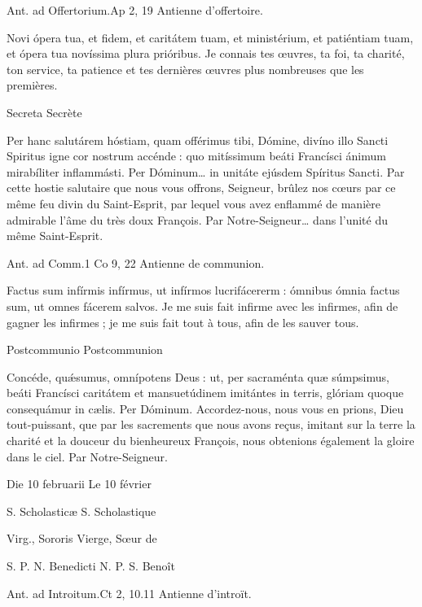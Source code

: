 \begin{paracol}{2}
Ant. ad Offertorium.\hfill Ap 2, 19
\switchcolumn
Antienne d’offertoire.
\switchcolumn*

Novi ópera tua, et fidem, et caritátem tuam, et ministérium, et patiéntiam tuam, et ópera tua novíssima plura prióribus.
\switchcolumn
Je connais tes œuvres, ta foi, ta charité, ton service, ta patience et tes dernières œuvres plus nombreuses que les premières.
\switchcolumn*

Secreta
\switchcolumn
Secrète
\switchcolumn*

Per hanc salutárem hóstiam,  quam offérimus tibi, Dómine, divíno illo Sancti Spiritus igne cor nostrum accénde : quo mitíssimum beáti Francísci ánimum mirabíliter inflammásti. Per Dóminum… in unitáte ejúsdem Spíritus Sancti.
\switchcolumn
Par cette hostie salutaire que nous vous  offrons, Seigneur, brûlez nos cœurs par ce même feu divin du Saint-Esprit, par lequel vous avez enflammé de manière admirable l’âme du très doux François. Par Notre-Seigneur… dans l’unité du même Saint-Esprit.
\switchcolumn*

Ant. ad Comm.\hfill 1 Co 9, 22
\switchcolumn
Antienne de communion.
\switchcolumn*

Factus sum infírmis infírmus, ut infírmos lucrifácererm : ómnibus ómnia factus sum, ut omnes fácerem salvos.
\switchcolumn
Je me suis fait infirme avec les infirmes, afin de gagner les infirmes ; je me suis fait tout à tous, afin de les sauver tous.
\switchcolumn*

Postcommunio
\switchcolumn
Postcommunion
\switchcolumn*

Concéde, quǽsumus, omnípotens  Deus : ut, per sacraménta quæ súmpsimus, beáti Francísci caritátem et mansuetúdinem imitántes in terris, glóriam quoque consequámur in cælis. Per Dóminum.
\switchcolumn
Accordez-nous, nous vous en prions,  Dieu tout-puissant, que par les sacrements que nous avons reçus, imitant sur la terre la charité et la douceur du bienheureux François, nous obtenions également la gloire dans le ciel. Par Notre-Seigneur.
\switchcolumn*

Die 10 februarii
\switchcolumn
Le 10 février
\switchcolumn*

S. Scholasticæ
\switchcolumn
S. Scholastique
\switchcolumn*

Virg., Sororis
\switchcolumn
Vierge, Sœur de
\switchcolumn*

S. P. N. Benedicti
\switchcolumn
N. P. S. Benoît
\switchcolumn*

Ant. ad Introitum.\hfill Ct 2, 10.11
\switchcolumn
Antienne d’introït.
\switchcolumn*


\end{paracol}
